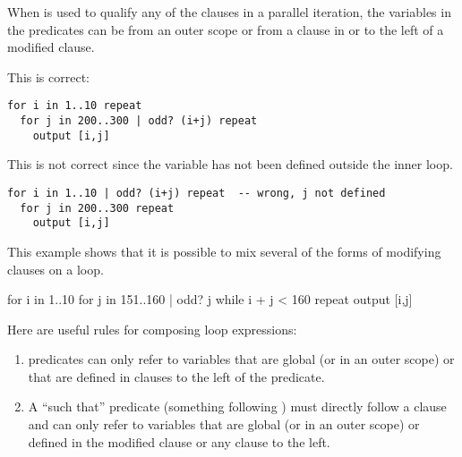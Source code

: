 {When \spadSyntax{|} is used to qualify any of the  clauses in a
parallel iteration, the variables in the predicates can be from an outer
scope or from a  clause in or to the left of a modified clause.

This is correct:
\begin{verbatim}
for i in 1..10 repeat
  for j in 200..300 | odd? (i+j) repeat
    output [i,j]
\end{verbatim}
This is not correct since the variable  has not been
defined outside the inner loop.
\begin{verbatim}
for i in 1..10 | odd? (i+j) repeat  -- wrong, j not defined
  for j in 200..300 repeat
    output [i,j]
\end{verbatim}


\begin{xtc}
\begin{xtccomment}
This example shows that it is possible to mix several of the
forms of  modifying clauses on a loop.
\end{xtccomment}
\begin{spadsrc}
for i in 1..10
    for j in 151..160 | odd? j
      while i + j < 160 repeat
        output [i,j]
\end{spadsrc}
\end{xtc}
%
Here are useful rules for composing loop expressions:
\begin{enumerate}
\item {} predicates can only refer to variables that
are global (or in an outer scope)
or that are defined in  clauses to the left of the
predicate.
\item A ``such that'' predicate (something following \spadSyntax{|})
must directly follow a  clause and can only refer to
variables that are global (or in an outer scope)
or defined in the modified  clause
or any  clause to the left.
\end{enumerate}


}
